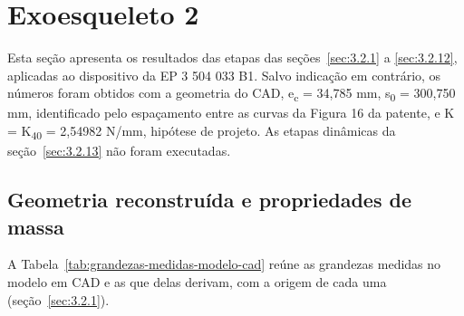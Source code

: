 \section{Exoesqueleto 2}\label{sec:4.2}

Esta seção apresenta os resultados das etapas das seções~\ref{sec:3.2.1} a \ref{sec:3.2.12}, aplicadas ao dispositivo da EP 3 504 033 B1. Salvo indicação em contrário, os números foram obtidos com a geometria do CAD, e\textsubscript{c} = 34,785 mm, s\textsubscript{0} = 300,750 mm, identificado pelo espaçamento entre as curvas da Figura 16 da patente, e K = K\textsubscript{40} = 2,54982 N/mm, hipótese de projeto. As etapas dinâmicas da seção~\ref{sec:3.2.13} não foram executadas.

\subsection{Geometria reconstruída e propriedades de massa}\label{sec:4.2.1}

A Tabela~\ref{tab:grandezas-medidas-modelo-cad} reúne as grandezas medidas no modelo em CAD e as que delas derivam, com a origem de cada uma (seção~\ref{sec:3.2.1}).

